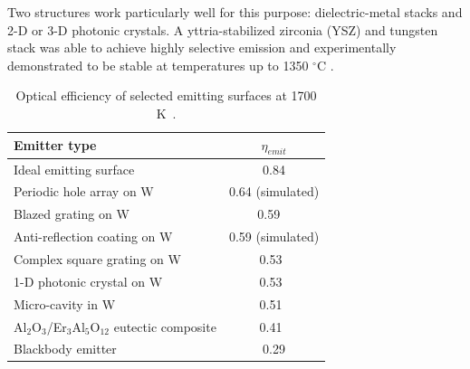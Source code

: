 \documentclass[10pt,letterpaper]{article}
\begin{document}
Two structures work particularly well for this purpose: dielectric-metal stacks and 2-D or 3-D photonic crystals.  A yttria-stabilized zirconia (YSZ) and tungsten stack was able to achieve highly selective emission and experimentally demonstrated to be stable at temperatures up to 1350 $^\circ$C \cite{SKY_JPE_2015}.

\begin{table}
	\caption{Optical efficiency of selected emitting surfaces at 1700 K~\cite{me_thesis}.}
	\label{FOM_table}
	\begin{center}
		\begin{tabular}{|lc|}
			\hline
			Emitter type & $\eta_{emit}$\\
			\hline	
			Ideal emitting surface & 0.84 \\
			Periodic hole array on W & 0.64 (simulated)\\
			Blazed grating on W & 0.59 ~\cite{me2} \\
			Anti-reflection coating on W & 0.59 (simulated) \\
			Complex square grating on W & 0.53~\cite{paper2_ref14}\\
			1-D photonic crystal on W & 0.53~\cite{SKY_JPE_2015}\\
			Micro-cavity in W & 0.51~\cite{paper2_ref6} \\
			{A}l$_2${O}$_3$/{E}r$_3${A}l$_5${O}$_{12}$ eutectic composite & 0.41~\cite{exp_tokyo}\\
			Blackbody emitter & 0.29\\
			\hline
		\end{tabular}
	\end{center}
\end{table}
\end{document}
